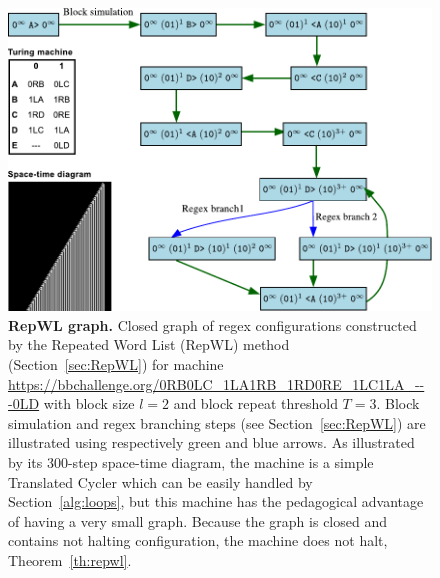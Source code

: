 
\newpage



\begin{figure}[h!]
    \centering
    \includegraphics[scale=0.8]{figures/RepWL/RepWL_graph.pdf}
    \caption{{\small \textbf{RepWL graph.} Closed graph of regex configurations constructed by the Repeated Word List (RepWL) method (Section~\ref{sec:RepWL}) for machine \url{https://bbchallenge.org/0RB0LC_1LA1RB_1RD0RE_1LC1LA_---0LD} with block size $l=2$ and block repeat threshold $T=3$. Block simulation and regex branching steps (see Section~\ref{sec:RepWL}) are illustrated using respectively green and blue arrows. As illustrated by its 300-step space-time diagram, the machine is a simple Translated Cycler which can be easily handled by Section~\ref{alg:loops}, but this machine has the pedagogical advantage of having a very small graph. Because the graph is closed and contains not halting configuration, the machine does not halt, Theorem~\ref{th:repwl}.}}\label{fig:repWL}
\end{figure}

